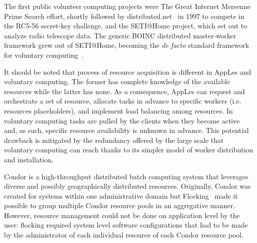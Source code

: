 \documentclass{sig-alternate}
\begin{document}
The first public volunteer computing projects were The Great Internet Mersenne
Prime Search effort\cite{woltman:2004:gimps}, shortly followed by
distributed.net~\cite{Lawton:2000:distributednet} in 1997 to compete in the
RC5-56 secret-key challenge, and the SETI@Home project, which set out to
analyze radio telescope data. The generic BOINC distributed master-worker
framework grew out of SETI@Home, becoming the {\it de facto} standard framework
for voluntary computing~\cite{Anderson:2004:BSP:1032646.1033223}.

It should be noted that process of resource acquisition is different in AppLes
and voluntary computing. The former has complete knowledge of the available
resources while the latter has none. As a consequence, AppLes can request and
orchestrate a set of resource, allocate tasks in advance to specific workers
(i.e. resources placeholders), and implement load balancing among resources. In
voluntary computing tasks are pulled by the clients when they become active
and, as such, specific resource availability is unknown in advance. This
potential drawback is mitigated by the redundancy offered by the large scale
that voluntary computing can reach thanks to its simpler model of worker
distribution and installation.


Condor is a high-throughput distributed batch computing system that leverages
diverse and possibly geographically distributed resources. Originally, Condor
was created for systems within one administrative domain but
Flocking~\cite{Epema:1996:flocking} made it possible to group multiple Condor
resource pools in an aggregative manner. However, resource management could not
be done on application level by the user: flocking required system level
software configurations that had to be made by the administrator of each
individual resource of each Condor resource pool. 
\end{document}
